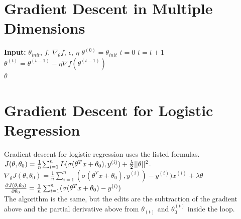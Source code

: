 \documentclass{article}
\begin{document}
    \section{Gradient Descent in Multiple Dimensions}
    \begin{algorithm}
    \begin{algorithmic}[]
        \State \textbf{Input:} $\theta_{init}$, $f$, $\nabla_\theta{f}$, $\epsilon$, $\eta$
        \State $\theta^{(0)} = \theta_{init}$
        \State $t=0$
            \State $t = t+1$
            \State $\theta^{(t)}=\theta^{(t-1)}-\eta{\nabla{f(\theta^{(t-1)})}}$
        \EndWhile \\
        \Return $\theta$
    \end{algorithmic}
    \end{algorithm}

    \section{Gradient Descent for Logistic Regression}
    Gradient descent for logistic regression uses the listed formulas. \\
    $J(\theta, \theta_0) = {1\over{n}}{\sum_{i=1}^n{L(\sigma(\theta^Tx+\theta_0),y^{(i)})}+\frac{\lambda}{2}{||\theta||^2}}$. \\
    $\nabla_\theta{J(\theta, \theta_0)}=\frac{1}{n}\sum_{i=1}^{n}{(\sigma(\theta^Tx+\theta_0),y^{(i)})-y^{(i)})x^{(i)}}+\lambda\theta$\\
    $\frac{\partial J(\theta, \theta_0)}{\partial \theta_0}={1\over{n}}\sum^n_{i=1}({\sigma(\theta^Tx+\theta_0)}-y^{(i)})$ \\
    The algorithm is the same, but the edits are the subtraction of the gradient above and the partial derivative above from $\theta_{(t)}$ and $\theta_0^{(t)}$ inside the loop.
\end{document}
